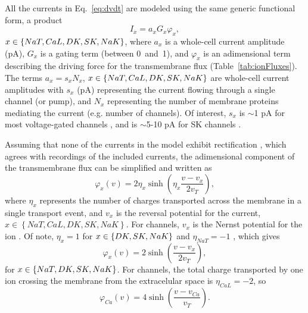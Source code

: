 \documentclass[12pt]{article}
\begin{document}
All the currents in Eq.~\eqref{eq:dvdt} are modeled using the same generic functional form, a product
\begin{equation*}
    I_x = a_x G_x    \varphi_x, 
\end{equation*}
 $x \in \left\{NaT,CaL,DK,SK,NaK\right\}$, where $a_x$ is a whole-cell current amplitude (pA), $G_x$ is a gating term (between 0~and~1), and $\varphi_x$ is an adimensional term describing the driving force for the transmembrane flux (Table~\ref{tab:ionFluxes}). The terms $a_x= s_x N_x$, $x \in \left\{NaT,CaL,DK,SK,NaK\right\}$ are whole-cell current amplitudes with
$s_x$ (pA) representing the current flowing through a single channel (or pump), and $N_x$ representing the number of membrane proteins mediating the current (e.g. {number of {\K} channels}). Of interest, $s_x$ is $\sim$1 pA for most voltage-gated channels \citep{hille2001ion}, and is $\sim$5-10 pA for SK channels \cite{stocker20042+}.

Assuming that none of the currents in the model exhibit rectification  \citep{herrera2018thermodynamic}, which agrees with recordings of the included currents, the adimensional component of the transmembrane flux can  be simplified and written as
\begin{equation}
    \varphi_x(v) = 2\eta_x \sinh\left(\eta_x \frac{v-v_x}{2v_T}\right),
\end{equation} 
where $\eta_x$ represents the number of charges transported across the membrane in a single transport event, and $v_x$ is the reversal potential for the current,   
 $x \in \left\{NaT,CaL,DK,SK,NaK \right\}$. For channels, $v_x$ is the Nernst potential for the ion \citep{herrera2018thermodynamic}. Of note,  $\eta_x=1$ for $x \in \left\{DK,SK,NaK\right\}$ and $\eta_{NaT}=-1$   \citep{herrera2018thermodynamic}, which gives 
\begin{equation*}
    \varphi_x(v) = 2 \sinh\left( \frac{v-v_{x}}{2v_T}\right),
\end{equation*} 
for $x \in \left\{NaT,DK,SK,NaK\right\}$.
For {\Ca} channels, the total charge transported by one ion crossing the membrane from the extracelular space is $\eta_{CaL}=-2$, so
\begin{equation*}
    \varphi_{Ca}(v) = 4 \sinh\left( \frac{v-v_{Ca}}{v_T}\right).
\end{equation*} 
\end{document}
